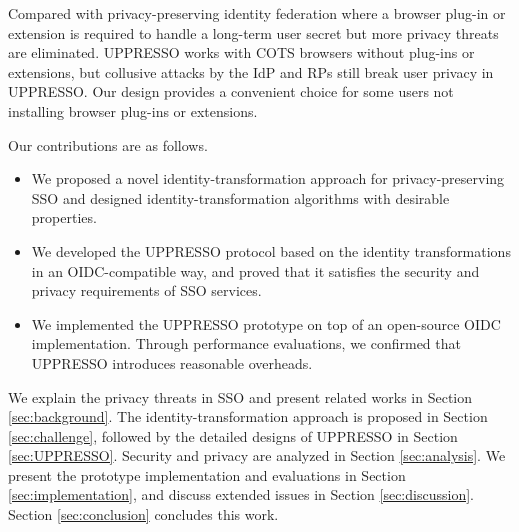 Compared with privacy-preserving identity federation \cite{prima,PseudoID,Opaak,ELPASSO,uprov,UnlimitID,hyperledge-idemix}
    where a browser plug-in or extension is required to handle a long-term user secret
    but
    more privacy threats are eliminated.
UPPRESSO works with COTS browsers without plug-ins or extensions,
    but collusive attacks by the IdP and RPs still break user privacy in UPPRESSO.
Our design provides a convenient choice for some users not installing browser plug-ins or extensions.

Our contributions are as follows.
\begin{itemize}
\setlength{\topsep}{0pt}
\setlength{\partopsep}{0pt}
\setlength{\itemsep}{0pt}
\setlength{\parsep}{0pt}
\setlength{\parskip}{0pt}
\item We proposed a novel identity-transformation approach for privacy-preserving SSO and designed identity-transformation algorithms with desirable properties.
\item We developed the UPPRESSO protocol based on the identity transformations in an OIDC-compatible way, and proved that it satisfies the security and privacy requirements of SSO services.
\item We implemented the UPPRESSO prototype on top of an open-source OIDC implementation. Through performance evaluations, we confirmed that UPPRESSO introduces reasonable overheads.
\end{itemize}


We explain the privacy threats in SSO and present related works in Section \ref{sec:background}.
The identity-transformation approach is proposed in Section \ref{sec:challenge}, followed by the detailed designs of UPPRESSO in Section \ref{sec:UPPRESSO}.
Security and privacy are analyzed in Section \ref{sec:analysis}.
We present the prototype implementation and evaluations in Section \ref{sec:implementation}, and discuss extended issues in Section \ref{sec:discussion}. Section \ref{sec:conclusion} concludes this work.
